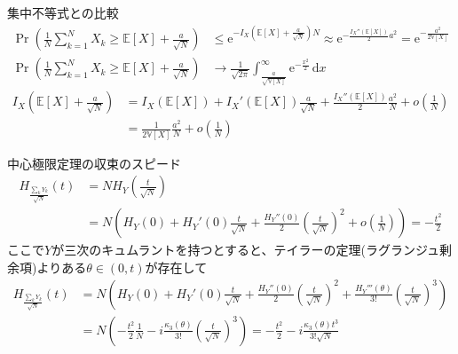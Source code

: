 \documentclass[lualatex,handout]{beamer}
\newcommand{\expt}[1]{\mathbb{E}\left[#1\right]}
\newcommand{\var}[1]{\mathbb{V}\left[#1\right]}
\newcommand\dx{{\,\mathrm{d}x}}
\theoremstyle{definition}
\begin{document}
\begin{frame}{集中不等式との比較}
\begin{align*}
\Pr\left(\frac1N\sum_{k=1}^N X_k\ge \expt{X} + \frac{a}{\sqrt{N}}\right) &\le \mathrm{e}^{-I_X\left(\expt{X}+\frac{a}{\sqrt{N}}\right)N}
\approx \mathrm{e}^{-\frac{I_X''(\expt{X})}2 a^2}
= \mathrm{e}^{-\frac{a^2}{2\var{X}}}\\
\Pr\left(\frac1N\sum_{k=1}^N X_k\ge \expt{X} + \frac{a}{\sqrt{N}}\right) &\to 
\frac1{\sqrt{2\pi}}\int_{\frac{a}{\sqrt{\var{X}}}}^\infty \mathrm{e}^{-\frac{x^2}2}\dx
\end{align*}
\begin{align*}
I_X\left(\expt{X}+\frac{a}{\sqrt{N}}\right)&=I_X(\expt{X}) + I_X'(\expt{X})\frac{a}{\sqrt{N}} + \frac{I_X''(\expt{X})}2\frac{a^2}N + o\left(\frac1N\right)\\
&= \frac1{2\var{X}}\frac{a^2}N + o\left(\frac1N\right)
\end{align*}
\end{frame}

\begin{frame}{中心極限定理の収束のスピード}
\begin{align*}
H_{\frac{\sum_kY_k}{\sqrt{N}}}(t) &= 
NH_Y\left(\frac{t}{\sqrt{N}}\right)\\
&=N\left(H_Y(0) + H_Y'(0)\frac{t}{\sqrt{N}} + \frac{H_Y''(0)}2\left(\frac{t}{\sqrt{N}}\right)^2 + o\left(\frac{1}{N}\right)\right)
= -\frac{t^2}2
\end{align*}
ここで$Y$が三次のキュムラントを持つとすると、テイラーの定理(ラグランジュ剰余項)よりある$\theta\in(0,t)$が存在して
\begin{align*}
H_{\frac{\sum_kY_k}{\sqrt{N}}}(t) &= 
N\left(H_Y(0) + H_Y'(0)\frac{t}{\sqrt{N}} + \frac{H_Y''(0)}2\left(\frac{t}{\sqrt{N}}\right)^2 + \frac{H_Y'''(\theta)}{3!} \left(\frac{t}{\sqrt{N}}\right)^3\right)\\
&=N\left(-\frac{t^2}2\frac1N - i\frac{\kappa_3(\theta)}{3!} \left(\frac{t}{\sqrt{N}}\right)^3\right)
=-\frac{t^2}2 - i\frac{\kappa_3(\theta)t^3}{3!\sqrt{N}}
\end{align*}
\end{frame}
\end{document}
